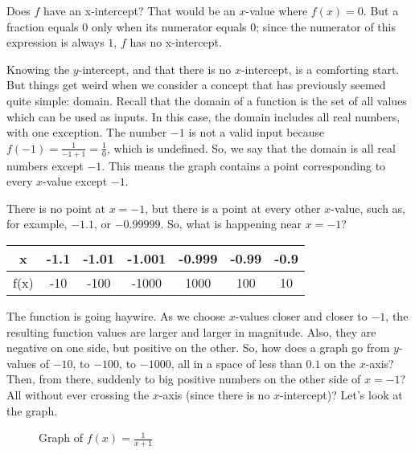 Does \( f \) have an x-intercept? That would be an \( x \)-value where \( f(x) = 0 \). But a fraction equals \( 0 \) only when its numerator equals \( 0 \); since the numerator of this expression is always \( 1 \), \( f \) has no x-intercept. 

Knowing the \( y \)-intercept, and that there is no \( x \)-intercept, is a comforting start. But things get weird when we consider a concept that has previously seemed quite simple: domain. Recall that the domain of a function is the set of all values which can be used as inputs. In this case, the domain includes all real numbers, with one exception. The number \( -1 \) is not a valid input because \( f(-1) = \frac{1}{-1+1} = \frac{1}{0} \), which is undefined. So, we say that the domain is all real numbers except \( -1 \). This means the graph contains a point corresponding to every \( x \)-value except \( -1 \).

There is no point at \( x = -1 \), but there is a point at every other \( x \)-value, such as, for example, \( -1.1 \), or \( -0.99999 \). So, what is happening near \( x = -1 \)?

\begin{center}
\begin{tabular}{ |c|c|c|c|c|c|c| } 
 \hline
 x & -1.1 & -1.01 & -1.001 & -0.999 & -0.99 & -0.9 \\ 
 \hline
 f(x) & -10 & -100 & -1000 & 1000 & 100 & 10 \\ 
 \hline
\end{tabular}
\end{center}

The function is going haywire. As we choose \( x \)-values closer and closer to \( -1 \), the resulting function values are larger and larger in magnitude. Also, they are negative on one side, but positive on the other. So, how does a graph go from \( y \)-values of \( -10 \), to \( -100 \), to \( -1000 \), all in a space of less than \( 0.1 \) on the \( x \)-axis? Then, from there, suddenly to big positive numbers on the other side of \( x = -1 \)? All without ever crossing the \( x \)-axis (since there is no \( x \)-intercept)? Let's look at the graph.

\begin{figure}[htbp]
  \centering
  \caption{Graph of \( f(x) = \frac{1}{x+1} \)}
\end{figure}


